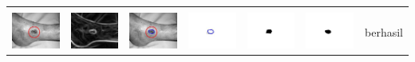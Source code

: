 \begin{table}[H]
\begin{tabular}{|m{0.7in}|m{0.7in}|m{0.7in}|m{0.7in}|m{0.7in}|m{0.7in}|m{0.7in}|}
		&  &  & & & &  \\
		\includegraphics[width=0.7in]{dataset/dataset_3/luka_merah/ready/30_interp_init.jpg}&
		\includegraphics[width=0.7in]{dataset/dataset_3/luka_merah/ready/30_interp_ext.jpg}&
		\includegraphics[width=0.7in]{dataset/dataset_3/luka_merah/ready/30_interp_result.jpg}&
		\includegraphics[width=0.7in]{dataset/dataset_3/luka_merah/ready/30_gt_r.jpg}&
		\includegraphics[width=0.7in]{dataset/dataset_3/luka_merah/ready/30_r.jpg}&
		\includegraphics[width=0.7in]{dataset/dataset_3/luka_merah/ready/30_interp_r.jpg}&
		berhasil\\
		\hline
			
	\end{tabular}
\end{table}


